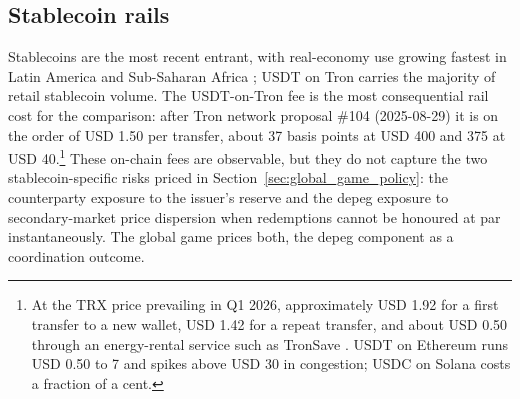 \subsection{Stablecoin rails}\label{sub:stablecoin_rails}

Stablecoins are the most recent entrant, with real-economy use growing fastest in Latin America and Sub-Saharan Africa \citep{chainalysis_2025}; USDT on Tron carries the majority of retail stablecoin volume. The USDT-on-Tron fee is the most consequential rail cost for the comparison: after Tron network proposal \#104 (2025-08-29) it is on the order of USD 1.50 per transfer, about 37 basis points at USD 400 and 375 at USD 40.\footnote{At the TRX price prevailing in Q1 2026, approximately USD 1.92 for a first transfer to a new wallet, USD 1.42 for a repeat transfer, and about USD 0.50 through an energy-rental service such as TronSave \citep{tronsave_blog_2026}. USDT on Ethereum runs USD 0.50 to 7 and spikes above USD 30 in congestion; USDC on Solana costs a fraction of a cent.} These on-chain fees are observable, but they do not capture the two stablecoin-specific risks priced in Section~\ref{sec:global_game_policy}: the counterparty exposure to the issuer's reserve and the depeg exposure to secondary-market price dispersion when redemptions cannot be honoured at par instantaneously. The global game prices both, the depeg component as a coordination outcome.
